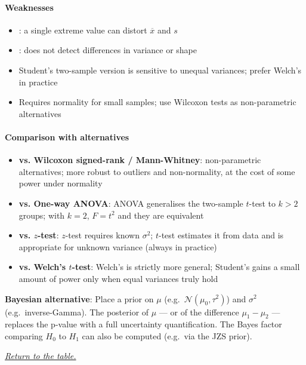 \paragraph{Weaknesses}
\begin{itemize}
    \item {}: a single extreme value can distort $\overline{x}$
        and $s$
    \item {}: does not detect differences in variance or shape
    \item Student's two-sample version is sensitive to unequal variances; prefer Welch's
        in practice
    \item Requires normality for small samples; use Wilcoxon tests as non-parametric
        alternatives
\end{itemize}

\paragraph{Comparison with alternatives}
\begin{itemize}
    \item \textbf{vs. Wilcoxon signed-rank / Mann-Whitney}: non-parametric alternatives;
        more robust to outliers and non-normality, at the cost of some power under normality
    \item \textbf{vs. One-way ANOVA}: ANOVA generalises the two-sample $t$-test to
        $k>2$ groups; with $k=2$, $F = t^2$ and they are equivalent
    \item \textbf{vs. $z$-test}: $z$-test requires known $\sigma^2$; $t$-test estimates
        it from data and is appropriate for unknown variance (always in practice)
    \item \textbf{vs. Welch's $t$-test}: Welch's is strictly more general; Student's
        gains a small amount of power only when equal variances truly hold
\end{itemize}

\textbf{Bayesian alternative}: Place a prior on $\mu$ (e.g.\ $\mathcal{N}(\mu_0,
\tau^2)$) and $\sigma^2$ (e.g.\ inverse-Gamma). The posterior of $\mu$ — or of the
difference $\mu_1 - \mu_2$ — replaces the p-value with a full uncertainty
quantification. The Bayes factor comparing $H_0$ to $H_1$ can also be computed
(e.g.\ via the JZS prior).

\textit{\hyperref[statistical_method_table]{Return to the table.}}
